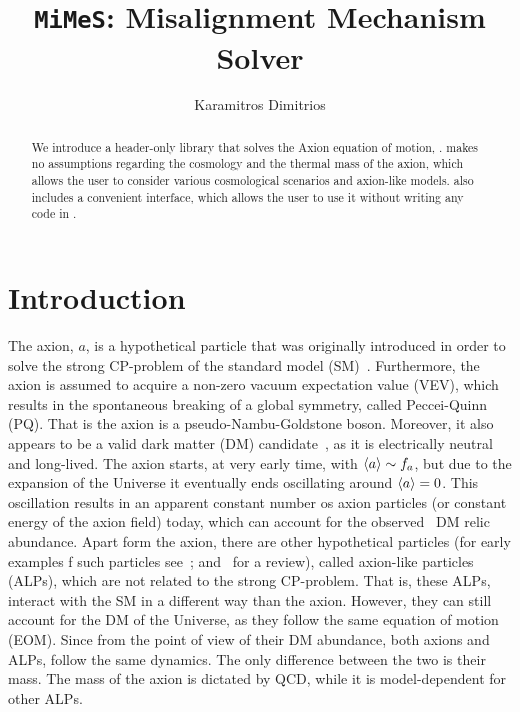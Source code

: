 \documentclass[11pt,a4paper]{article}
\author[ ]{Karamitros Dimitrios}
\affil[ ]{\em School of Physics and Astronomy, The University of Manchester,
	Manchester M13 9PL, United Kingdom}
\affil[ ]{\textit{E-mail: } \href{mailto:dimitrios.karamitros@manchester.ac.uk}{\color{blue}{dimitrios.karamitros@manchester.ac.uk}}}
\title{{\tt MiMeS}: Misalignment Mechanism Solver}
\begin{document}
\maketitle


\begin{abstract}
	We introduce a \CPP header-only library that solves the Axion equation of motion, \mimes.  
	\mimes makes no assumptions regarding the cosmology and the thermal mass of the axion, which allows the user 
	to consider various cosmological scenarios and axion-like models.
	\mimes also includes a convenient \PY interface, which allows the user to use it without writing any code in \CPP.
\end{abstract}


\newpage
\tableofcontents




\section{Introduction}\label{sec:intro}
\setcounter{equation}{0}
%
The axion, $a$, is a hypothetical particle that was originally introduced in order to solve the strong CP-problem of the standard model (SM)~\cite{Peccei:1977hh,Weinberg:1977ma,Wilczek:1977pj}. Furthermore, the axion is assumed to acquire a non-zero vacuum expectation value (VEV), which results in the spontaneous breaking of a global symmetry, called Peccei-Quinn (PQ). That is the axion is a pseudo-Nambu-Goldstone boson.  Moreover, it also appears to be a valid dark matter (DM) candidate~\cite{Preskill:1982cy,Dine:1982ah,Abbott:1982af}, as it is electrically neutral and long-lived.  The axion starts, at very early time, with $\langle a \rangle \sim f_{a}{}$, but due to the expansion of the Universe it eventually ends oscillating around $\langle a \rangle = 0$.   This oscillation results in an apparent constant number os axion particles (or constant energy of the axion field) today, which can account for the observed~\cite{Planck:2018vyg} DM relic abundance. 
%
Apart form the axion, there are other hypothetical particles (for early examples f such particles see~\cite{Chikashige:1980ui,Georgi:1981pu}; and~\cite{Ringwald:2014vqa} for a review), called axion-like particles (ALPs), which are not related to the strong CP-problem. That is, these ALPs, interact with the SM in a different way than the axion. However, they can still account for the DM of the Universe, as they follow the same equation of motion (EOM). Since from the point of view of their DM abundance, both axions and ALPs, follow the same dynamics. The only difference between the two is their mass. The mass of the axion is dictated by QCD, while it is model-dependent for other ALPs.   
\end{document}
